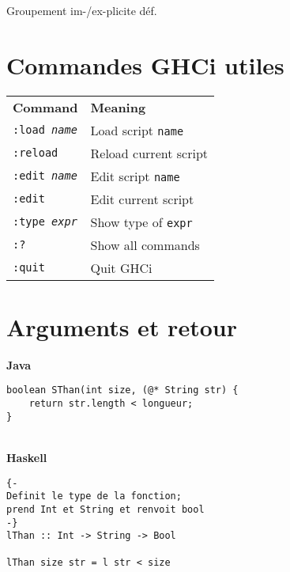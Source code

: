 \documentclass{report}
\begin{document}
\begin{multicols*}{3}
\begin{EExample}{Groupement im-/ex-plicite déf.}{}
\end{EExample}

\section{Commandes GHCi utiles}
\begin{table}[H]
\centering
\begin{tabular}{l|l}
\textbf{Command} & \textbf{Meaning} \\ 
\texttt{:load \textit{name}} & Load script \texttt{name} \\ 
\texttt{:reload} & Reload current script \\ 
\texttt{:edit \textit{name}} & Edit script \texttt{name} \\ 
\texttt{:edit} & Edit current script \\ 
\texttt{:type \textit{expr}} & Show type of \texttt{expr} \\ 
\texttt{:?} & Show all commands \\ 
\texttt{:quit} & Quit GHCi \\ 
\end{tabular}
\end{table}






\section*{Arguments et retour}

\noindent\textbf{Java}  
\mbox{}\\
\begin{adjustbox}{width=1\linewidth}
\begin{lstlisting}[style=JavaDraculaWhite] 
boolean SThan(int size, (@* String str) {
    return str.length < longueur;
}  
\end{lstlisting}
\end{adjustbox}

\mbox{}
\\




\noindent\textbf{Haskell}  
\mbox{}\\

\begin{lstlisting}[style=DraculaWhiteHaskell]
{-
Definit le type de la fonction; 
prend Int et String et renvoit bool
-}
lThan :: Int -> String -> Bool 

lThan size str = l str < size
\end{lstlisting}







  \end{multicols*}
\end{document}
